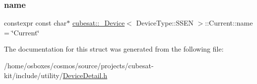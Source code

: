 \subsubsection{\texorpdfstring{name}{name}}
{\footnotesize\ttfamily constexpr const char$\ast$ \hyperlink{structcubesat_1_1__Device}{cubesat\+::\+\_\+\+Device}$<$ Device\+Type\+::\+S\+S\+EN $>$\+::Current\+::name = \char`\"{}Current\char`\"{}\hspace{0.3cm}{\ttfamily [static]}}



The documentation for this struct was generated from the following file\+:\begin{DoxyCompactItemize}
\item 
/home/osboxes/cosmos/source/projects/cubesat-\/kit/include/utility/\hyperlink{DeviceDetail_8h}{Device\+Detail.\+h}\end{DoxyCompactItemize}
